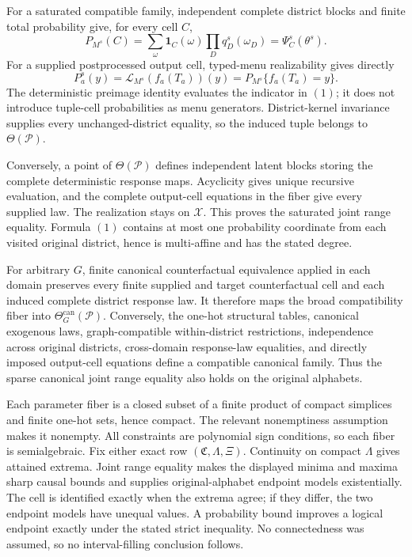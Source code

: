 For a saturated compatible family, independent complete district blocks and finite total probability give, for every cell \(C\),
\[
P_{M^s}(C)=
\sum_{\omega}\mathbf 1_C(\omega)
\prod_Dq_D^s(\omega_D)
=\Psi_C^s(\theta^s).
\tag{1}
\]
For a supplied postprocessed output cell, typed-menu realizability gives directly
\[
P_a^s(y)=\mathcal L_{M^s}(f_a(T_a))(y)
=P_{M^s}\{f_a(T_a)=y\}.
\tag{2}
\]
The deterministic preimage identity evaluates the indicator in \((1)\); it does not introduce tuple-cell probabilities as menu generators.  District-kernel invariance supplies every unchanged-district equality, so the induced tuple belongs to \(\Theta(\mathcal P)\).

Conversely, a point of \(\Theta(\mathcal P)\) defines independent latent blocks storing the complete deterministic response maps.  Acyclicity gives unique recursive evaluation, and the complete output-cell equations in the fiber give every supplied law.  The realization stays on \(\mathcal X\).  This proves the saturated joint range equality.  Formula \((1)\) contains at most one probability coordinate from each visited original district, hence is multi-affine and has the stated degree.

For arbitrary \(G\), finite canonical counterfactual equivalence applied in each domain preserves every finite supplied and target counterfactual cell and each induced complete district response law.  It therefore maps the broad compatibility fiber into \(\Theta_G^{\mathrm{can}}(\mathcal P)\).  Conversely, the one-hot structural tables, canonical exogenous laws, graph-compatible within-district restrictions, independence across original districts, cross-domain response-law equalities, and directly imposed output-cell equations define a compatible canonical family.  Thus the sparse canonical joint range equality also holds on the original alphabets.

Each parameter fiber is a closed subset of a finite product of compact simplices and finite one-hot sets, hence compact.  The relevant nonemptiness assumption makes it nonempty.  All constraints are polynomial sign conditions, so each fiber is semialgebraic.  Fix either exact row \((\mathfrak C,\Lambda,\Xi)\).  Continuity on compact \(\Lambda\) gives attained extrema.  Joint range equality makes the displayed minima and maxima sharp causal bounds and supplies original-alphabet endpoint models existentially.  The cell is identified exactly when the extrema agree; if they differ, the two endpoint models have unequal values.  A probability bound improves a logical endpoint exactly under the stated strict inequality.  No connectedness was assumed, so no interval-filling conclusion follows.


